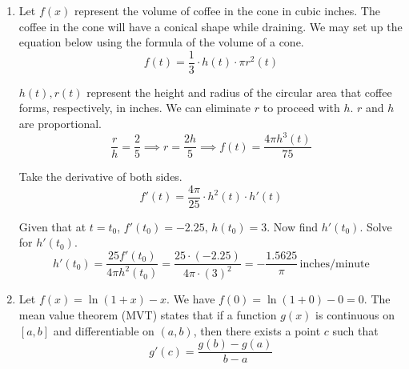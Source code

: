 \documentclass[a4paper, 12pt]{article}
\begin{document}
\begin{enumerate}[leftmargin=*,label=\textbf{\arabic*.}]
\begin{enumerate}[leftmargin=*,label=\textbf{\alph*.}]
\item Let $L$ be the value of the limit. Then, take the logarithm of both sides. Since the expression is continuous for $x>1$, we can take the logarithm function inside the limit.
\[L=\lim_{x\to1^+}\left(\sqrt x\right)^{\ln(x-1)}\implies
\ln(L) = \ln\left[\lim_{x\to1^+}\left(\sqrt x\right)^{\ln(x-1)}\right]\]
\begin{align*}
\ln(L)&=\lim_{x\to1^+}\ln\left[(\sqrt x)^{\ln(x-1)}\right]=\lim_{x\to1^+}\left[\ln(x-1)\cdot\ln(\sqrt x)\right]=\lim_{x\to1^+}\frac{\ln(x-1)}{\frac1{\ln\left(\sqrt x\right)}}\quad\left[\frac\infty\infty\right]\\[1em]&\overset{\text{L'H.}}{=}\lim_{x\to1^+}\frac{\frac1{{x-1}}}{\frac1{-\ln^2\left(\sqrt x\right)}\cdot\frac1{\sqrt x}\cdot\frac1{2\sqrt x}}=\lim_{x\to1^+}\frac{\ln^2(\sqrt x)\cdot 2x}{1-x}\quad\left[\frac00\right]\\[1em]&\overset{\text{L'H.}}{=}\lim_{x\to1^+}\frac{2\ln\left(\sqrt x\right)\cdot \frac1{\sqrt x}\cdot\frac1{2\sqrt x}\cdot2x+\ln^2 (\sqrt x)\cdot 2 }{-1}\\[1em]&=\lim_{x\to1^+} \left[-2\ln\left(\sqrt x\right)-2\ln^2\left(\sqrt x\right) \right]\\[1em]&=2\ln\left(\sqrt 1\right) + 2\ln^2\left(\sqrt 1\right)=0
\end{align*}

$\ln(L)=0$. Therefore, $\boxed{L=1}$.
\end{enumerate}

\item Let $f(x)$ represent the volume of coffee in the cone in cubic inches. The coffee in the cone will have a conical shape while draining. We may set up the equation below using the formula of the volume of a cone.
\[f(t) = \frac13\cdot h(t)\cdot \pi r^2(t)\]

$h(t), r(t)$ represent the height and radius of the circular area that coffee forms, respectively, in inches. We can eliminate $r$ to proceed with $h$. $r$ and $h$ are proportional.
\[\frac rh=\frac25\implies r=\frac{2h}5\implies f(t)=\frac{4\pi h^3(t)}{75}\]

Take the derivative of both sides.
\[f'(t)=\frac{4\pi}{25}\cdot h^2(t)\cdot h'(t)\]

Given that at $t=t_0$, $f'(t_0) = -2.25,\,h(t_0) =3$. Now find $h'(t_0)$. Solve for $h'(t_0)$.
\[h'(t_0)=\frac{25f'(t_0)}{4\pi h^2(t_0)}=\frac{25\cdot(-2.25)}{4\pi\cdot(3)^2}=\boxed{-\frac{1.5625}\pi\,\text{inches/minute}}\]

\item Let $f(x) = \ln(1+x)-x$. We have $f(0) = \ln(1 + 0) - 0 = 0$. The mean value theorem (MVT) states that if a function $g(x)$ is continuous on $[a, b]$ and differentiable on $(a,b)$, then there exists a point $c$ such that
\[g'(c) = \frac{g(b)-g(a)}{b-a}\]


\end{enumerate}
\end{document}
